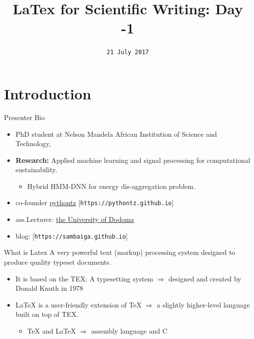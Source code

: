\documentclass{bredelebeamer}
\title[Latex]{\textbf{LaTex for Scientific Writing: Day -1}}
\institute[NMAIST]
{
	
	
	{\href{https://sambaiga.github.io/}{Anthony FAUSTINE}}. 
	\\[1.0cm]
	{\large
    The School of Computational and Communication Sciences and Engineering \\[1.0cm]
    NMAIST

	}
}
\date{\texttt{21 July 2017}}
\begin{document}
\begin{frame}
	\titlepage
\end{frame}







\section{Introduction}
\begin{frame}{Presenter Bio}
\begin{itemize}
\item \textsf{PhD student at Nelson Mandela African Institution of Science and Technology,} 
\item \textbf{Research:}  \textsf{Applied machine learning and signal processing for computational sustainability}.
\begin{itemize}
	\item \textsf{Hybrid HMM-DNN for energy dis-aggregation problem}.
\end{itemize}	
\item \textsf{co-founder \href{https://pythontz.github.io/}{pythontz} [\texttt{https://pythontz.github.io}]}
\item \textsf{ass.Lecturer: \href{www.udom.ac.tz}{the University of Dodoma}}
\item \textsf{blog}: [\texttt{https://sambaiga.github.io}]
\end{itemize}
\end{frame}


  \begin{frame}[<+->]{What is Latex}
  	A very powerful text (markup) processing system designed to produce quality typeset
  	documents.
  	\begin{itemize}
  		\item It is based on the \alert{TEX}: A typesetting system $\Rightarrow$ designed and created by Donald Knuth in 1978
  		\item \alert{LaTeX} is a user-friendly extension of TeX $\Rightarrow$  a slightly higher-level language built on top of TEX.
  		\begin{itemize}
  			\item TeX and LaTeX $\Rightarrow$ assembly language and C
  		\end{itemize}
  		
  	\end{itemize}
  \end{frame} 
\end{document}

